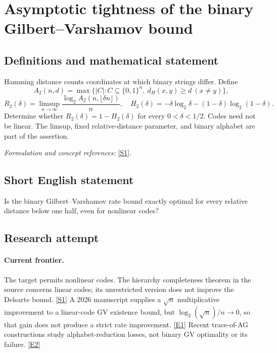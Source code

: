 \documentclass[11pt,a4paper]{article}
\newcommand{\sref}[2]{\hyperlink{source:#1:#2}{[S#2]}}
\newcommand{\eref}[2]{\hyperlink{extra:#1:#2}{[E#2]}}
\newif\ifshowcatalogue
\newcommand{\cataloguescope}[1]{\ifshowcatalogue
 \paragraph{Exact scope in the supplied catalogue.}
 \begin{quote}\small #1\end{quote}\fi}
\numberwithin{equation}{section}
\begin{document}
\setcounter{section}{0}
\clearpage
\section*{\texorpdfstring{Asymptotic tightness of the binary Gilbert–Varshamov bound}{Asymptotic tightness of the binary Gilbert–Varshamov bound}}\label{statement}
\subsection{Definitions and mathematical statement}
Hamming distance counts coordinates at which binary strings differ. Define
\[
 A_2(n,d)=\max\{|C|:C\subseteq\{0,1\}^n,\ d_H(x,y)\ge d\ (x\ne y)\},
\]
\[
 R_2(\delta)=\limsup_{n\to\infty}\frac{\log_2A_2(n,\lfloor\delta n\rfloor)}n,
 \quad H_2(\delta)=-\delta\log_2\delta-(1-\delta)\log_2(1-\delta).
\]
Determine whether $R_2(\delta)=1-H_2(\delta)$ for every $0<\delta<1/2$. Codes need not be linear. The limsup, fixed relative-distance parameter, and binary alphabet are part of the assertion.
\par\smallskip\textit{Formulation and concept references:} \sref{statement}{1}.
\cataloguescope{For integers n>=1 and d>=0, let A\_2(n,d) be the maximum cardinality of a binary code C subset \{0,1\}\textasciicircum{}n, not necessarily linear, with Hamming distance at least d between distinct codewords. For each fixed real 0<delta<1/2 define R\_2(delta)=limsup\_\{n->infinity\} n\textasciicircum{}(-1) log\_2 A\_2(n,floor(delta n)) and H\_2(delta)=-delta log\_2(delta)-(1-delta)log\_2(1-delta). Is R\_2(delta)=1-H\_2(delta) for every such delta?}
\subsection{Short English statement}
Is the binary Gilbert--Varshamov rate bound exactly optimal for every relative distance below one half, even for nonlinear codes?
\subsection{Research attempt}

\paragraph{Current frontier.}
The target permits nonlinear codes. The hierarchy completeness theorem in
the source concerns linear codes; its unrestricted version does not improve
the Delsarte bound. \sref{statement}{1} A 2026 manuscript supplies a $\sqrt n$
multiplicative improvement to a linear-code GV existence bound, but
$\log_2(\sqrt n)/n\to0$, so that gain does not produce a strict rate
improvement. \eref{statement}{1} Recent trace-of-AG constructions study
alphabet-reduction losses, not binary GV optimality or its failure.
\eref{statement}{2}
\end{document}
